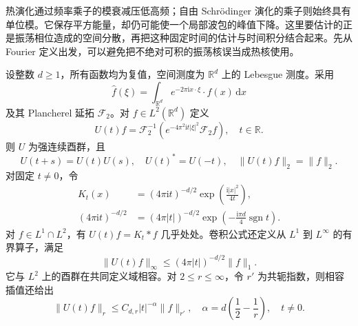热演化通过频率乘子的模衰减压低高频；自由 Schrödinger 演化的乘子则始终具有单位模。它保存平方能量，却仍可能使一个局部波包的峰值下降。这里要估计的正是振荡相位造成的空间分散，再把这种固定时间的估计与时间积分结合起来。先从 Fourier 定义出发，可以避免把不绝对可积的振荡核误当成热核使用。

\begin{proposition}[酉群与色散核]\label{b2:prop:E-dispersive-kernel}
设整数 \(d\geq1\)，所有函数均为复值，空间测度为 \(\mathbb R^d\) 上的 Lebesgue 测度。采用
\[
 \widehat f(\xi)=\int_{\mathbb R^d}
       e^{-2\pi\mathrm ix\cdot\xi}\cdot f(x)\,\mathrm dx
\]
及其 Plancherel 延拓 \(\mathcal F_2\)。对 \(f\in L^2(\mathbb R^d)\) 定义
\[
 U(t)f=\mathcal F_2^{-1}
       \left(e^{-4\pi^2\mathrm it|\xi|^2}\mathcal F_2f\right),
 \quad t\in\mathbb R.
\]
则 \(U\) 为强连续酉群，且
\[
 U(t+s)=U(t)U(s),\quad U(t)^*=U(-t),\quad
 \|U(t)f\|_2=\|f\|_2.
\]
对固定 \(t\ne0\)，令
\begin{equation}\label{b2:eq:E-fresnel-kernel}
 \begin{aligned}
 K_t(x)&=(4\pi\mathrm it)^{-d/2}
               \exp\left(\frac{\mathrm i|x|^2}{4t}\right),\\
 (4\pi\mathrm it)^{-d/2}
 &=(4\pi|t|)^{-d/2}
       \exp\left(-\frac{\mathrm i\pi d}{4}\operatorname{sgn}t\right).
 \end{aligned}
\end{equation}
对 \(f\in L^1\cap L^2\)，有 \(U(t)f=K_t*f\) 几乎处处。卷积公式还定义从 \(L^1\) 到 \(L^\infty\) 的有界算子，满足
\[
 \|U(t)f\|_\infty\leq(4\pi|t|)^{-d/2}\|f\|_1.
\]
它与 \(L^2\) 上的酉群在共同定义域相容。对 \(2\leq r\leq\infty\)，令 \(r'\) 为共轭指数，则相容插值还给出
\begin{equation}\label{b2:eq:E-dispersive-interpolation}
 \|U(t)f\|_r\leq C_{d,r}|t|^{-\alpha}\|f\|_{r'},
 \quad
 \alpha=d\left(\frac12-\frac1r\right),\quad t\ne0.
\end{equation}
\end{proposition}
